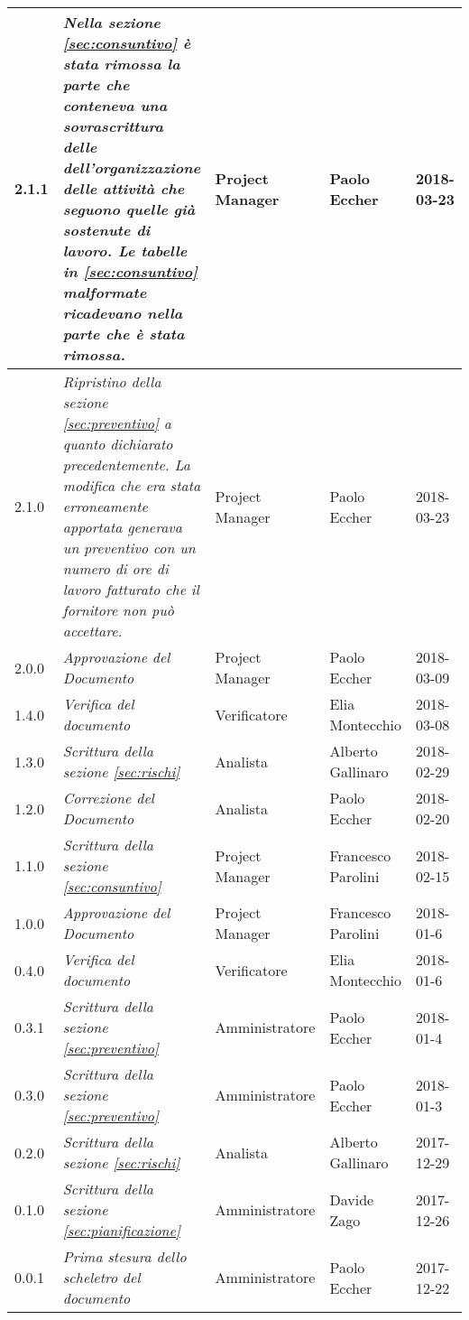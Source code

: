 \begin{longtable}[H]{C{2cm}|C{4cm}|C{3cm}|C{3cm}|R{2cm}}
		2.1.1 &\emph{ Nella sezione \ref{sec:consuntivo} è stata rimossa la parte che conteneva una sovrascrittura delle dell'organizzazione delle attività che seguono quelle già sostenute di lavoro. Le  tabelle in \ref{sec:consuntivo} malformate ricadevano nella parte che è stata rimossa.} & Project Manager & Paolo Eccher & 2018-03-23 \\
		\hline
		
		2.1.0 &\emph{Ripristino della sezione \ref{sec:preventivo} a quanto dichiarato precedentemente. La modifica che era stata erroneamente apportata generava un preventivo con un numero di ore di lavoro fatturato che il fornitore non può accettare. } & Project Manager & Paolo Eccher & 2018-03-23 \\
		\hline
		
		2.0.0 &\emph{Approvazione del Documento} & Project Manager & Paolo Eccher & 2018-03-09 \\
		\hline
		
		1.4.0 &\emph{Verifica del documento} & Verificatore & Elia Montecchio & 2018-03-08 \\
		\hline
		
		1.3.0 &\emph{Scrittura della sezione \ref{sec:rischi}} & Analista & Alberto Gallinaro & 2018-02-29 \\
		\hline

		1.2.0 &\emph{Correzione del Documento} & Analista & Paolo Eccher & 2018-02-20 \\
		\hline
		
		1.1.0 &\emph{Scrittura della sezione \ref{sec:consuntivo}} & Project Manager & Francesco Parolini & 2018-02-15 \\
		\hline
		
		1.0.0 &\emph{Approvazione del Documento} & Project Manager & Francesco Parolini & 2018-01-6 \\
		\hline
		
		0.4.0 &\emph{Verifica del documento} & Verificatore & Elia Montecchio & 2018-01-6 \\
		\hline
		
		0.3.1 &\emph{Scrittura della sezione \ref{sec:preventivo}} & Amministratore & Paolo Eccher  & 2018-01-4 \\
		\hline
		
		0.3.0 &\emph{Scrittura della sezione \ref{sec:preventivo}} & Amministratore & Paolo Eccher & 2018-01-3 \\
		\hline
		
		0.2.0 &\emph{Scrittura della sezione \ref{sec:rischi}} & Analista & Alberto Gallinaro & 2017-12-29 \\
		\hline
		
		0.1.0 &\emph{Scrittura della sezione \ref{sec:pianificazione}} & Amministratore & Davide Zago & 2017-12-26 \\
		\hline
		
		0.0.1 &\emph{Prima stesura dello scheletro del documento} & Amministratore & Paolo Eccher & 2017-12-22 \\
		
\end{longtable}
	

\clearpage